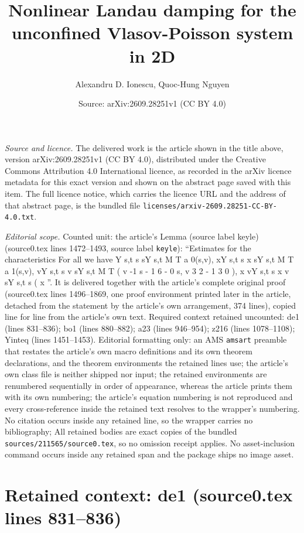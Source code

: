 \documentclass[10pt,a4paper]{amsart}
\title[Nonlinear Landau damping for the unconfined Vlasov-Poisson system in 2D]{Nonlinear Landau damping for the unconfined Vlasov-Poisson system in 2D}
\author{Alexandru D. Ionescu, Quoc-Hung Nguyen}
\date{Source: arXiv:2609.28251v1 (CC BY 4.0)}
\theoremstyle{plain}
\begin{document}
\maketitle

\noindent\emph{Source and licence.} The delivered work is the article shown in the title above, version arXiv:2609.28251v1 (CC BY 4.0), distributed under the Creative Commons Attribution 4.0 International licence, as recorded in the arXiv licence metadata for this exact version and shown on the abstract page saved with this item. The full licence notice, which carries the licence URL and the address of that abstract page, is the bundled file \texttt{licenses/arxiv-2609.28251-CC-BY-4.0.txt}.
\par\smallskip

\noindent\textit{Editorial scope.} Counted unit: the article's Lemma (source label keyle) (source0.tex lines 1472--1493, source label \texttt{keyle}): ``Estimates for the characteristics For all we have Y s,t s sY s,t M T a 0(s,v), xY s,t s x sY s,t M T a 1(s,v), vY s,t s v sY s,t M T ( v -1 s - 1 6 - 0 s, v 3 2 - 1 3 0 ), x vY s,t s x v sY s,t s ( x ''. It is delivered together with the article's complete original proof (source0.tex lines 1496--1869, one proof environment printed later in the article, detached from the statement by the article's own arrangement, 374 lines), copied line for line from the article's own text. Required context retained uncounted: de1 (lines 831--836); bo1 (lines 880--882); a23 (lines 946--954); z216 (lines 1078--1108); Yinteq (lines 1451--1453). Editorial formatting only: an AMS \texttt{amsart} preamble that restates the article's own macro definitions and its own theorem declarations, and the theorem environments the retained lines use; the article's own class file is neither shipped nor input; the retained environments are renumbered sequentially in order of appearance, whereas the article prints them with its own numbering; the article's equation numbering is not reproduced and every cross-reference inside the retained text resolves to the wrapper's numbering. No citation occurs inside any retained line, so the wrapper carries no bibliography; All retained bodies are exact copies of the bundled \texttt{sources/211565/source0.tex}, so no omission receipt applies. No asset-inclusion command occurs inside any retained span and the package ships no image asset.


\section*{Retained context: de1 (source0.tex lines 831--836)}
\end{document}
